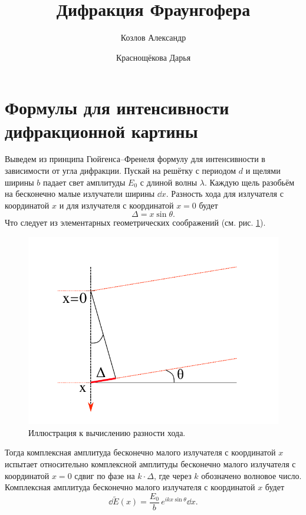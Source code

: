 \documentclass[12pt]{article}
\title{Дифракция Фраунгофера}
\author{Козлов Александр \and Краснощёкова Дарья}
\begin{document}
	\maketitle
	\section{Формулы для интенсивности дифракционной картины}
	Выведем из принципа Гюйгенса\---Френеля формулу для интенсивности в зависимости от угла дифракции. Пускай на решётку с периодом $d$ и щелями ширины $b$ падает свет амплитуды $E_0$ с длиной волны $\lambda$. Каждую щель разобьём на бесконечно малые излучатели ширины $\dd x$. Разность хода для излучателя с координатой $x$ и для излучателя с координатой $x=0$ будет
	\begin{equation}
		\Delta = x \sin{\theta}.
	\end{equation}
	Что следует из элементарных геометрических соображений (см. рис. \ref{fig:figure1}).
	\begin{figure}[htbp]
		\centering
		\includegraphics[width=\linewidth]{../images/fig1}
		\caption{Иллюстрация к вычислению разности хода.}
		\label{fig:figure1}
	\end{figure}
	Тогда комплексная амплитуда бесконечно малого излучателя с координатой $x$ испытает относительно комплексной амплитуды бесконечно малого излучателя с координатой $x=0$ сдвиг по фазе на $k\cdot\Delta$, где через $k$ обозначено волновое число. Комплексная амплитуда бесконечно малого излучателя с координатой $x$ будет
	\begin{equation}
	 	\dd \tilde{E}(x) = \dfrac{E_0}{b}\, e^{i k x \sin{\theta}}\dd x.
	\end{equation}
\end{document}
